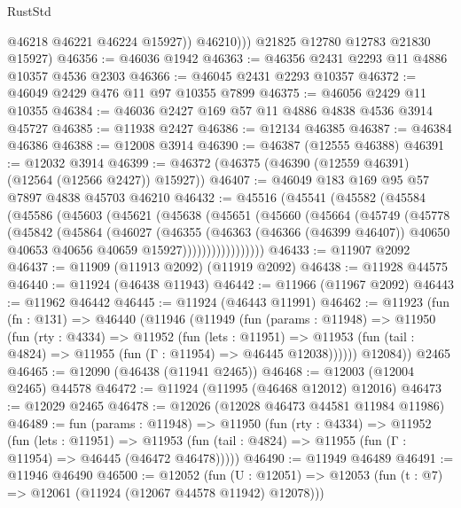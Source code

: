 \begin{lexlean}{RustStd}
\begin{coremodule}
{\begin{coremodule}
{{{{{{{{{{{{{{{{{{{{{{{{{{{{{{{{{{{{{{{{{{{{{{{{{{{{{{{{{{{{{{{{{{{{{{{{{{{{{{{{                @46218
                @46221
                @46224
                @15927))
            @46210)))
      @21825
      @12780
      @12783
      @21830
      @15927)
@46356 := @46036 @1942
@46363 := @46356 @2431 @2293 @11 @4886 @10357 @4536 @2303
@46366 := @46045 @2431 @2293 @10357
@46372 := @46049 @2429 @476 @11 @97 @10355 @7899
@46375 := @46056 @2429 @11 @10355
@46384 := @46036 @2427 @169 @57 @11 @4886 @4838 @4536 @3914 @45727
@46385 := @11938 @2427
@46386 := @12134 @46385
@46387 := @46384 @46386
@46388 := @12008 @3914
@46390 := @46387 (@12555 @46388)
@46391 := @12032 @3914
@46399 := @46372 (@46375 (@46390 (@12559 @46391) (@12564 (@12566 @2427)) @15927))
@46407 := @46049 @183 @169 @95 @57 @7897 @4838 @45703 @46210
@46432 := @45516
    (@45541
      (@45582
        (@45584
          (@45586
            (@45603
              (@45621
                (@45638
                  (@45651
                    (@45660
                      (@45664
                        (@45749
                          (@45778
                            (@45842
                              (@45864
                                (@46027
                                  (@46355
                                    (@46363
                                      (@46366 (@46399 @46407))
                                      @40650
                                      @40653
                                      @40656
                                      @40659
                                      @15927)))))))))))))))))
@46433 := @11907 @2092
@46437 := @11909 (@11913 @2092) (@11919 @2092)
@46438 := @11928 @44575
@46440 := @11924 (@46438 @11943)
@46442 := @11966 (@11967 @2092)
@46443 := @11962 @46442
@46445 := @11924 (@46443 @11991)
@46462 := @11923
    (fun (fn : @131) =>
    @46440
      (@11946
        (@11949
          (fun (params : @11948) =>
          @11950
            (fun (rty : @4334) =>
            @11952
              (fun (lets : @11951) =>
              @11953 (fun (tail : @4824) => @11955 (fun (Γ : @11954) => @46445 @12038))))))
        @12084))
    @2465
@46465 := @12090 (@46438 (@11941 @2465))
@46468 := @12003 (@12004 @2465) @44578
@46472 := @11924 (@11995 (@46468 @12012) @12016)
@46473 := @12029 @2465
@46478 := @12026 (@12028 @46473 @44581 @11984 @11986)
@46489 := fun (params : @11948) =>
  @11950
    (fun (rty : @4334) =>
    @11952
      (fun (lets : @11951) =>
      @11953 (fun (tail : @4824) => @11955 (fun (Γ : @11954) => @46445 (@46472 @46478)))))
@46490 := @11949 @46489
@46491 := @11946 @46490
@46500 := @12052
    (fun (U : @12051) => @12053 (fun (t : @7) => @12061 (@11924 (@12067 @44578 @11942) @12078)))
}}}}}}}}}}}}}}}}}}}}}}}}}}}}}}}}}}}}}}}}}}}}}}}}}}}}}}}}}}}}}}}}}}}}}}}}}}}}}}}}
\end{coremodule}}
\end{coremodule}
\end{lexlean}
